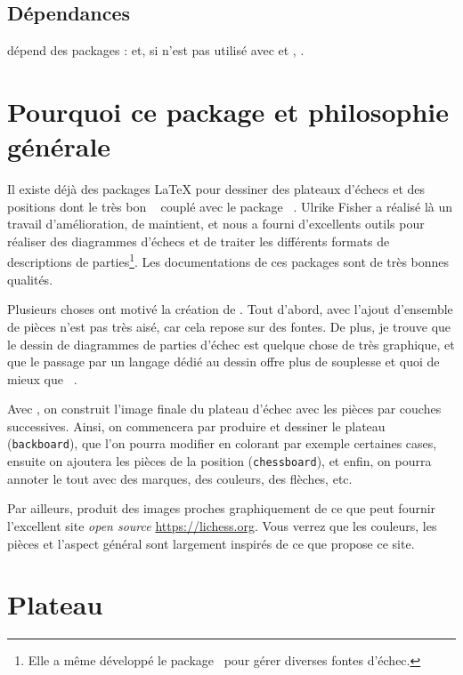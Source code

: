 \documentclass[french]{ltxdoc}
\begin{document}
\subsection{Dépendances}

\mpchess dépend des packages \MP:  et, si
\mpchess n’est pas utilisé avec  et ,
.
\section{Pourquoi ce package et philosophie générale}

Il existe déjà des packages \LaTeX{} pour dessiner des plateaux d’échecs et des
positions dont le très bon ~\cite{ctan-xskak} couplé avec le
package ~\cite{ctan-chessboard}. Ulrike Fisher a réalisé là un
travail d’amélioration, de maintient, et nous a fourni d’excellents outils pour
réaliser des diagrammes d’échecs et de traiter les différents formats de
descriptions de parties\footnote{Elle a même développé le
package~ pour gérer diverses fontes d’échec.}. Les
documentations de ces packages sont de très bonnes qualités.

Plusieurs choses ont motivé la création de \mpchess. Tout d’abord, avec
 l’ajout d’ensemble de pièces n’est pas très aisé, car cela
repose sur des fontes. De plus, je trouve que le dessin de diagrammes de parties
d’échec est quelque chose de très graphique, et que le passage par un langage
dédié au dessin offre plus de souplesse et quoi de mieux que \MP~\cite{ctan-metapost}.


Avec \mpchess, on construit l’image finale du plateau d’échec avec les pièces
par couches successives. Ainsi, on commencera par produire et dessiner le
plateau (\lstinline+backboard+), que l’on pourra modifier en colorant par
exemple certaines cases, ensuite on ajoutera les pièces de la position
(\lstinline+chessboard+), et enfin, on pourra annoter le tout avec des marques, des couleurs, des flèches, etc.

Par ailleurs, \mpchess produit des images proches graphiquement de ce que peut
fournir l’excellent site \emph{open source} \url{https://lichess.org}. Vous
verrez que les couleurs, les pièces et l’aspect général sont largement inspirés
de ce que propose ce site.

\section{Plateau}
\end{document}
